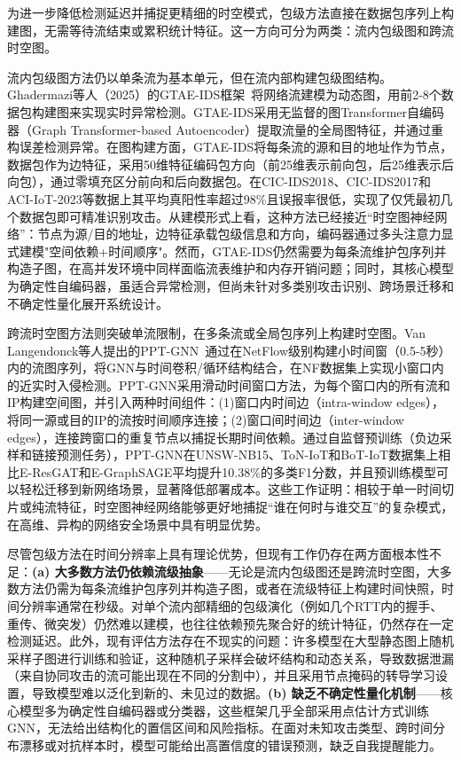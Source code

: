 为进一步降低检测延迟并捕捉更精细的时空模式，包级方法直接在数据包序列上构建图，无需等待流结束或累积统计特征。这一方向可分为两类：流内包级图和跨流时空图。

流内包级图方法仍以单条流为基本单元，但在流内部构建包级图结构。Ghadermazi等人（2025）的GTAE-IDS框架~\cite{GTAE-IDS}将网络流建模为动态图，用前2-8个数据包构建图来实现实时异常检测。GTAE-IDS采用无监督的图Transformer自编码器（Graph Transformer-based Autoencoder）提取流量的全局图特征，并通过重构误差检测异常。在图构建方面，GTAE-IDS将每条流的源和目的地址作为节点，数据包作为边特征，采用50维特征编码包方向（前25维表示前向包，后25维表示后向包），通过零填充区分前向和后向数据包。在CIC-IDS2018、CIC-IDS2017和ACI-IoT-2023等数据上其平均真阳性率超过98\%且误报率很低，实现了仅凭最初几个数据包即可精准识别攻击。从建模形式上看，这种方法已经接近``时空图神经网络''：节点为源/目的地址，边特征承载包级信息和方向，编码器通过多头注意力显式建模"空间依赖+时间顺序"。然而，GTAE-IDS仍然需要为每条流维护包序列并构造子图，在高并发环境中同样面临流表维护和内存开销问题；同时，其核心模型为确定性自编码器，虽适合异常检测，但尚未针对多类别攻击识别、跨场景迁移和不确定性量化展开系统设计。

跨流时空图方法则突破单流限制，在多条流或全局包序列上构建时空图。Van Langendonck等人提出的PPT-GNN~\cite{PPT-GNN}通过在NetFlow级别构建小时间窗（0.5-5秒）内的流图序列，将GNN与时间卷积/循环结构结合，在NF数据集上实现小窗口内的近实时入侵检测。PPT-GNN采用滑动时间窗口方法，为每个窗口内的所有流和IP构建空间图，并引入两种时间组件：(1)窗口内时间边（intra-window edges），将同一源或目的IP的流按时间顺序连接；(2)窗口间时间边（inter-window edges），连接跨窗口的重复节点以捕捉长期时间依赖。通过自监督预训练（负边采样和链接预测任务），PPT-GNN在UNSW-NB15、ToN-IoT和BoT-IoT数据集上相比E-ResGAT和E-GraphSAGE平均提升10.38\%的多类F1分数，并且预训练模型可以轻松迁移到新网络场景，显著降低部署成本。这些工作证明：相较于单一时间切片或纯流特征，时空图神经网络能够更好地捕捉``谁在何时与谁交互''的复杂模式，在高维、异构的网络安全场景中具有明显优势。

尽管包级方法在时间分辨率上具有理论优势，但现有工作仍存在两方面根本性不足：\textbf{(a) 大多数方法仍依赖流级抽象}——无论是流内包级图还是跨流时空图，大多数方法仍需为每条流维护包序列并构造子图，或者在流级特征上构建时间快照，时间分辨率通常在秒级。对单个流内部精细的包级演化（例如几个RTT内的握手、重传、微突发）仍然难以建模，也往往依赖预先聚合好的统计特征，仍然存在一定检测延迟。此外，现有评估方法存在不现实的问题：许多模型在大型静态图上随机采样子图进行训练和验证，这种随机子采样会破坏结构和动态关系，导致数据泄漏（来自协同攻击的流可能出现在不同的分割中），并且采用节点掩码的转导学习设置，导致模型难以泛化到新的、未见过的数据。\textbf{(b) 缺乏不确定性量化机制}——核心模型多为确定性自编码器或分类器，这些框架几乎全部采用点估计方式训练GNN，无法给出结构化的置信区间和风险指标。在面对未知攻击类型、跨时间分布漂移或对抗样本时，模型可能给出高置信度的错误预测，缺乏自我提醒能力。

